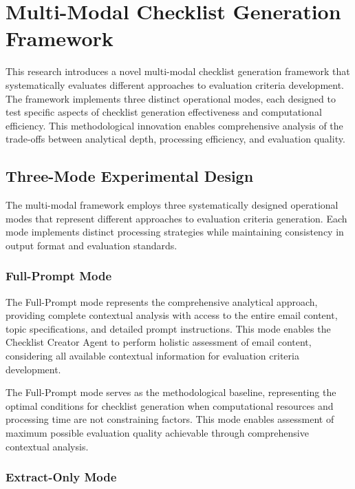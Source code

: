 \section{Multi-Modal Checklist Generation Framework}
\label{sec:multi-modal-checklist}

This research introduces a novel multi-modal checklist generation framework that systematically evaluates different approaches to evaluation criteria development. The framework implements three distinct operational modes, each designed to test specific aspects of checklist generation effectiveness and computational efficiency. This methodological innovation enables comprehensive analysis of the trade-offs between analytical depth, processing efficiency, and evaluation quality.

\subsection{Three-Mode Experimental Design}

The multi-modal framework employs three systematically designed operational modes that represent different approaches to evaluation criteria generation. Each mode implements distinct processing strategies while maintaining consistency in output format and evaluation standards.

\subsubsection{Full-Prompt Mode}

The Full-Prompt mode represents the comprehensive analytical approach, providing complete contextual analysis with access to the entire email content, topic specifications, and detailed prompt instructions. This mode enables the Checklist Creator Agent to perform holistic assessment of email content, considering all available contextual information for evaluation criteria development.

The Full-Prompt mode serves as the methodological baseline, representing the optimal conditions for checklist generation when computational resources and processing time are not constraining factors. This mode enables assessment of maximum possible evaluation quality achievable through comprehensive contextual analysis.

\subsubsection{Extract-Only Mode}

